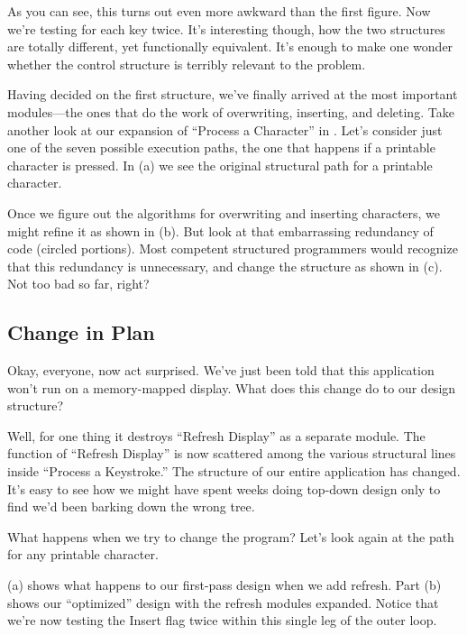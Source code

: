 As you can see, this turns out even more awkward than the first
figure. Now we're testing for each key twice. It's interesting though,
how the two structures are totally different, yet functionally
equivalent. It's enough to make one wonder whether the control
structure is terribly relevant to the problem.


Having decided on the first structure, we've finally arrived at the
most important modules---the ones that do the work of overwriting,
inserting, and deleting. Take another look at our expansion of
``Process a Character'' in . Let's consider just one of the
seven possible execution paths, the one that happens if a printable
character is pressed.  In (a) we see the original structural
path for a printable character.

Once we figure out the algorithms for overwriting and inserting
characters, we might refine it as shown in (b). But look at
that embarrassing redundancy of code (circled portions). Most
competent structured programmers would recognize that this redundancy
is unnecessary, and change the structure as shown in (c).
Not too bad so far, right?

\subsection{Change in Plan}

Okay, everyone, now act surprised. We've just been told that this
application won't run on a memory-mapped display. What does this
change do to our design structure?


Well, for one thing it destroys ``Refresh Display'' as a separate
module. The function of ``Refresh Display'' is now scattered among the
various structural lines inside ``Process a Keystroke.'' The structure of
our entire application has changed. It's easy to see how we might have
spent weeks doing top-down design only to find we'd been barking down
the wrong tree.

What happens when we try to change the program? Let's look again
at the path for any printable character.

 (a) shows what happens to our first-pass design when we
add refresh. Part (b) shows our ``optimized'' design with the refresh
modules expanded. Notice that we're now testing the Insert flag twice
within this single leg of the outer loop.

